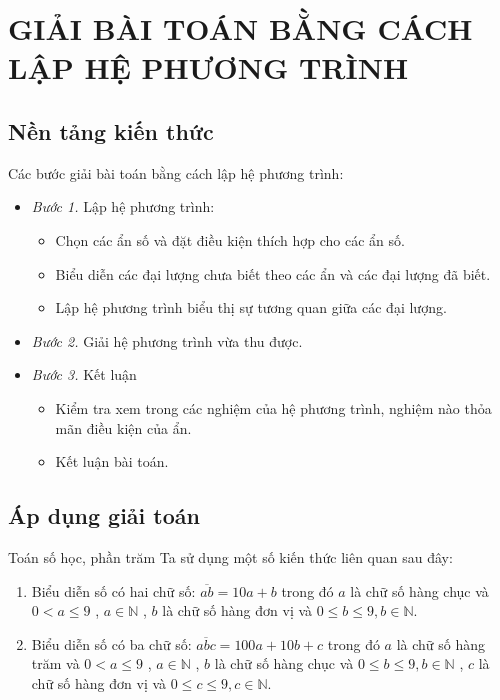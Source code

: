 
\section{GIẢI BÀI TOÁN BẰNG CÁCH LẬP HỆ PHƯƠNG TRÌNH}
\subsection{Nền tảng kiến thức}
Các bước giải bài toán bằng cách lập hệ phương trình:
\begin{itemize}
	\item \textit{Bước 1.} Lập hệ phương trình:
	\begin{itemize}
		\item Chọn các ẩn số và đặt điều kiện thích hợp cho các ẩn số.
		\item Biểu diễn các đại lượng chưa biết theo các ẩn và các đại lượng đã biết.
		\item Lập hệ phương trình biểu thị sự tương quan giữa các đại lượng.
	\end{itemize}
	\item \textit{Bước 2.} Giải hệ phương trình vừa thu được.
	\item \textit{Bước 3.} Kết luận
	\begin{itemize}
		\item Kiểm tra xem trong các nghiệm của hệ phương trình, nghiệm nào thỏa mãn điều kiện của ẩn.
		\item Kết luận bài toán.
	\end{itemize}
\end{itemize}

\subsection{Áp dụng giải toán}

\begin{dang}{Toán số học, phần trăm}
Ta sử dụng một số kiến thức liên quan sau đây:
\begin{enumerate}[1.]
	\item Biểu diễn số có hai chữ số:  $\overline {ab}  = 10a + b$  trong đó  $a$  là chữ số hàng chục và  $0 < a \le 9$ ,  $a \in \mathbb{N}$ ,  $b$  là chữ số hàng đơn vị và  $0 \le b \le 9,b \in \mathbb{N}$.
	\item Biểu diễn số có ba chữ số:  $\overline {abc}  = 100a + 10b + c$  trong đó  $a$  là chữ số hàng trăm và  $0 < a \le 9$ ,  $a \in \mathbb{N}$ ,  $b$  là chữ số hàng chục và  $0 \le b \le 9,b \in \mathbb{N}$ ,  $c$  là chữ số hàng đơn vị và  $0 \le c \le 9,c \in \mathbb{N}$.
\end{enumerate}
\end{dang}

